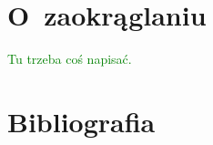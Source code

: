 \documentclass[a4paper,11pt]{article}
\newcommand{\toadd}[1]{\textcolor{green}{#1}}
\begin{document}
\appendix  %



\section{O~zaokrąglaniu}
\label{sec:zaokrąglanie}

\toadd{Tu trzeba coś napisać.}



\section*{Bibliografia}
\end{document}
